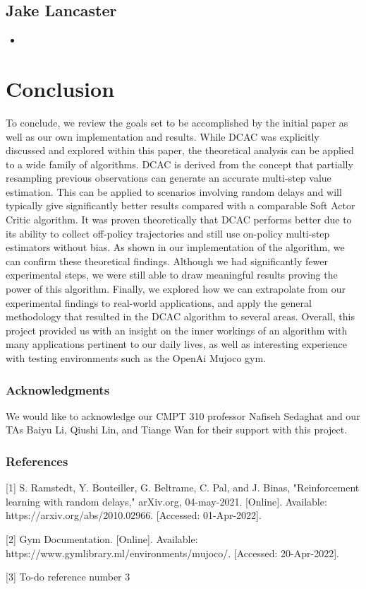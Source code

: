 \documentclass{article} %
\begin{document}
\begin{multicols}{2}
\subsection{Jake Lancaster}
\begin{itemize}[itemsep=-2pt,topsep=-5pt, leftmargin=10pt]
\item 
\end{itemize} 

\end{multicols}

\section{Conclusion}

To conclude, we review the goals set to be accomplished by the initial paper as well as our own implementation and results. While DCAC was explicitly discussed and explored within this paper, the theoretical analysis can be applied to a wide family of algorithms. DCAC is derived from the concept that partially resampling previous observations can generate an accurate multi-step value estimation. This can be applied to scenarios involving random delays and will typically give significantly better results compared with a comparable Soft Actor Critic algorithm. It was proven theoretically that DCAC performs better due to its ability to collect off-policy trajectories and still use on-policy multi-step estimators without bias. As shown in our implementation of the algorithm, we can confirm these theoretical findings. Although we had significantly fewer experimental steps, we were still able to draw meaningful results proving the power of this algorithm. Finally, we explored how we can extrapolate from our experimental findings to real-world applications, and apply the general methodology that resulted in the DCAC algorithm to several areas. Overall, this project provided us with an insight on the inner workings of an algorithm with many applications pertinent to our daily lives, as well as interesting experience with testing environments such as the OpenAi Mujoco gym.


\subsubsection*{Acknowledgments}
We would like to acknowledge our CMPT 310 professor Nafiseh Sedaghat and our TAs 
Baiyu Li, Qiushi Lin, and Tiange Wan for their support with this project.

\subsubsection*{References}
\small{
[1] S. Ramstedt, Y. Bouteiller, G. Beltrame, C. Pal, and J. Binas, 
      "Reinforcement learning with random delays," arXiv.org, 04-may-2021. [Online]. 
      Available: https://arxiv.org/abs/2010.02966. [Accessed: 01-Apr-2022].

[2] Gym Documentation. [Online]. Available: https://www.gymlibrary.ml/environments/mujoco/. [Accessed: 20-Apr-2022]. 

[3] To-do reference number 3
}
\end{document}
